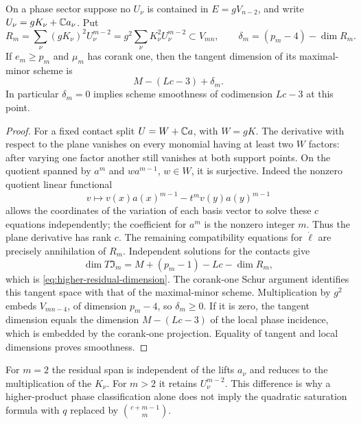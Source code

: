 \begin{theorem}\label{thm:higher-residual}
On a phase sector suppose no $U_\nu$ is contained in
$E=gV_{n-2}$, and write $U_\nu=gK_\nu+\mathbb C a_\nu$.
Put
\[
 R_m=\sum_\nu(gK_\nu)^2U_\nu^{m-2}
     =g^2\sum_\nu K_\nu^2U_\nu^{m-2}\subset V_{mn},
 \qquad \delta_m=(p_m-4)-\dim R_m.
\]
If $e_m\ge p_m$ and $\mu_m$ has corank one, then the tangent dimension
of its maximal-minor scheme is
\begin{equation}\label{eq:higher-residual-dimension}
 M-(Lc-3)+\delta_m.
\end{equation}
In particular $\delta_m=0$ implies scheme smoothness of codimension
$Lc-3$ at this point.
\end{theorem}
\begin{proof}
For a fixed contact split $U=W+\mathbb C a$, with $W=gK$.
The derivative with respect to the plane vanishes on every monomial
having at least two $W$ factors: after varying one factor another still
vanishes at both support points. On the quotient spanned by $a^m$ and
$wa^{m-1}$, $w\in W$, it is surjective. Indeed the nonzero quotient
linear functional
\[
 v\longmapsto v(x)a(x)^{m-1}-t^mv(y)a(y)^{m-1}
\]
allows the coordinates of the variation of each basis vector to solve
these $c$ equations independently; the coefficient for $a^m$ is the
nonzero integer $m$. Thus the plane derivative has rank $c$.
The remaining compatibility equations for $\dot\ell$ are precisely
annihilation of $R_m$. Independent solutions for the contacts give
\[
 \dim T\mathfrak I_m=M+(p_m-1)-Lc-\dim R_m,
\]
which is \eqref{eq:higher-residual-dimension}.
The corank-one Schur argument identifies this tangent space with that
of the maximal-minor scheme. Multiplication by $g^2$ embeds
$V_{mn-4}$, of dimension $p_m-4$, so $\delta_m\ge0$.
If it is zero, the tangent dimension equals the dimension $M-(Lc-3)$
of the local phase incidence, which is embedded by the corank-one
projection. Equality of tangent and local dimensions proves smoothness.
\end{proof}
For $m=2$ the residual span is independent of the lifts $a_\nu$ and
reduces to the multiplication of the $K_\nu$. For $m>2$ it retains
$U_\nu^{m-2}$. This difference is why a higher-product phase
classification alone does not imply the quadratic saturation formula
with $q$ replaced by $\binom{c+m-1}{m}$.
